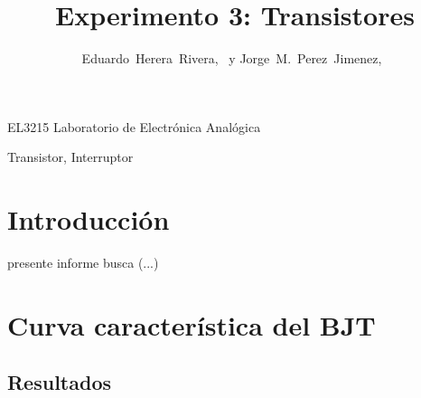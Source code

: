 \documentclass[journal]{IEEEtran}
\begin{document}
%
\title{Experimento 3: Transistores}


\author{Eduardo~Herera~Rivera,~
        y Jorge~M.~Perez~Jimenez,~
}


%
{EL3215 Laboratorio de Electrónica Analógica}


\maketitle


\begin{abstract}

\end{abstract}

\begin{IEEEkeywords}
Transistor, Interruptor
\end{IEEEkeywords}


\section{Introducción}

 presente informe busca	(...)



\section{Curva característica del BJT}
\subsection{Resultados}
\end{document}
